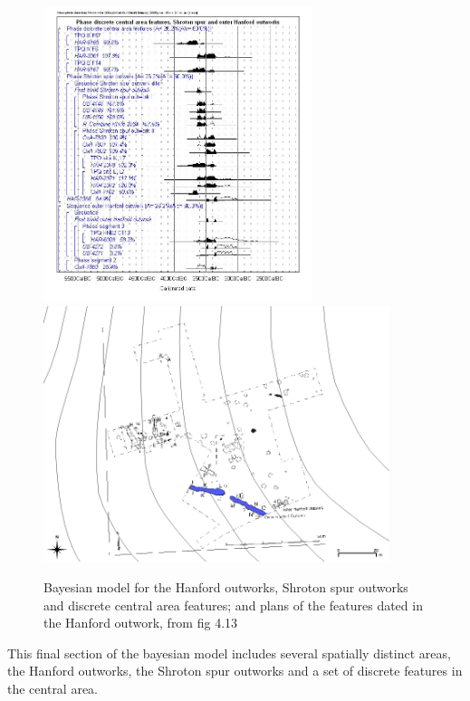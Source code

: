 \begin{figure}
\centering
	\includegraphics[width=0.7\textwidth]{figures/model6}
	\includegraphics[width=0.9\textwidth]{figures/model6-plan3}
  \caption{Bayesian model for the Hanford outworks, Shroton spur outworks and discrete central area features; and plans of the features dated in the Hanford outwork, from fig 4.13 \citep[144]{Whittle:2011kl}}
  \label{fig:hanfordetc}
\end{figure}

This final section of the bayesian model includes several spatially distinct areas, the Hanford outworks, the Shroton spur outworks and a set of discrete features in the central area.

